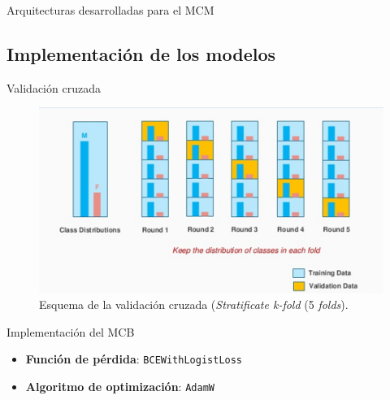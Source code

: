 \begin{frame}{Arquitecturas desarrolladas para el MCM}
\end{frame}


\subsection{Implementación de los modelos}
\begin{frame}{Validación cruzada}

	\begin{figure}
		\centering
	    \includegraphics[width=\linewidth]{./img/stratifiedkfolds.png}
    		\caption{Esquema de la validación cruzada (\textit{Stratificate k-fold} (5 \textit{folds}).}
	\end{figure}

\end{frame}

\begin{frame}{Implementación del MCB}
	\begin{itemize}
		\item \textbf{Función de pérdida}: \texttt{BCEWithLogistLoss}
		\item \textbf{Algoritmo de optimización}: \texttt{AdamW}
	\end{itemize}
	
	
	\begin{table}[H]
		\centering 
		\caption{Valores de los hiperparámetros utilizados en los experimentos del modelo de clasificación binaria.}
		\label{tab:hiperBIN}
	\end{table}
\end{frame}

